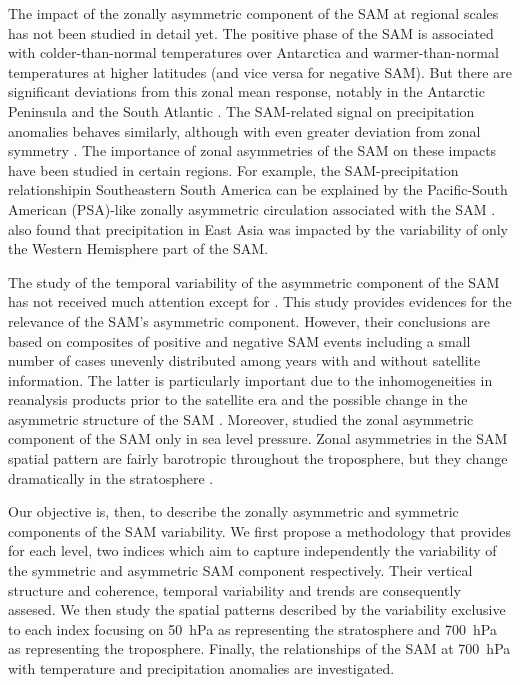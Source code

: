 \documentclass[smallextended]{svjour3}       %
\begin{document}
The impact of the zonally asymmetric component of the SAM at regional scales has not been studied in detail yet. The positive phase of the SAM is associated with colder-than-normal temperatures over Antarctica and warmer-than-normal temperatures at higher latitudes \citep{jones2019} (and vice versa for negative SAM). But there are significant deviations from this zonal mean response, notably in the Antarctic Peninsula and the South Atlantic \citep{fogt2012}. The SAM-related signal on precipitation anomalies behaves similarly, although with even greater deviation from zonal symmetry \citep{lim2016}. The importance of zonal asymmetries of the SAM on these impacts have been studied in certain regions. For example, the SAM-precipitation relationshipin Southeastern South America can be explained by the Pacific-South American (PSA)-like zonally asymmetric circulation associated with the SAM \citep{silvestri2009, rosso2018}. \citet{fan2007} also found that precipitation in East Asia was impacted by the variability of only the Western Hemisphere part of the SAM.

The study of the temporal variability of the asymmetric component of the SAM has not received much attention except for \citet{fogt2012}. This study provides evidences for the relevance of the SAM's asymmetric component. However, their conclusions are based on composites of positive and negative SAM events including a small number of cases unevenly distributed among years with and without satellite information. The latter is particularly important due to the inhomogeneities in reanalysis products prior to the satellite era and the possible change in the asymmetric structure of the SAM \citep{silvestri2009}. Moreover, \citet{fogt2012} studied the zonal asymmetric component of the SAM only in sea level pressure. Zonal asymmetries in the SAM spatial pattern are fairly barotropic throughout the troposphere, but they change dramatically in the stratosphere \citep{baldwin2009}.

Our objective is, then, to describe the zonally asymmetric and symmetric components of the SAM variability. We first propose a methodology that provides for each level, two indices which aim to capture independently the variability of the symmetric and asymmetric SAM component respectively. Their vertical structure and coherence, temporal variability and trends are consequently assesed. We then study the spatial patterns described by the variability exclusive to each index focusing on 50~hPa as representing the stratosphere and 700~hPa as representing the troposphere. Finally, the relationships of the SAM at 700~hPa with temperature and precipitation anomalies are investigated.
\end{document}
